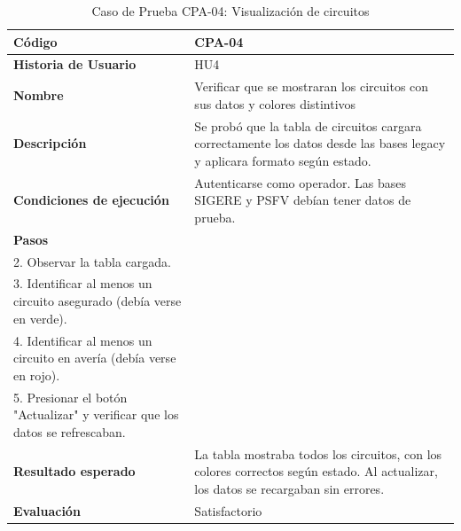 \begin{table}[H]
\centering
\caption{Caso de Prueba CPA-04: Visualización de circuitos}
\label{tab:cpa_04}
\footnotesize
\begin{tabular}{|p{3cm}|p{9cm}|}
\hline
\textbf{Código} & CPA-04 \\
\hline
\textbf{Historia de Usuario} & HU4 \\
\hline
\textbf{Nombre} & Verificar que se mostraran los circuitos con sus datos y colores distintivos \\
\hline
\textbf{Descripción} & Se probó que la tabla de circuitos cargara correctamente los datos desde las bases legacy y aplicara formato según estado. \\
\hline
\textbf{Condiciones de ejecución} & Autenticarse como operador. Las bases SIGERE y PSFV debían tener datos de prueba. \\
\hline
\textbf{Pasos} & 
\begin{minipage}[t]{9cm}
1. Ir a la sección "Circuitos". \\
2. Observar la tabla cargada. \\
3. Identificar al menos un circuito asegurado (debía verse en verde). \\
4. Identificar al menos un circuito en avería (debía verse en rojo). \\
5. Presionar el botón "Actualizar" y verificar que los datos se refrescaban.
\end{minipage} \\
\hline
\textbf{Resultado esperado} & La tabla mostraba todos los circuitos, con los colores correctos según estado. Al actualizar, los datos se recargaban sin errores. \\
\hline
\textbf{Evaluación} & Satisfactorio \\
\hline
\end{tabular}
\end{table}


